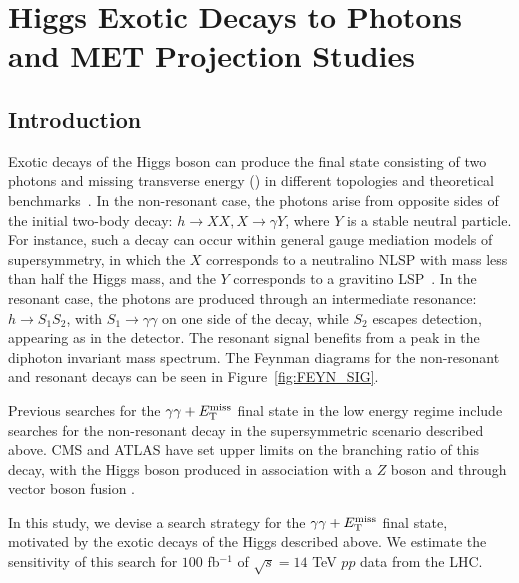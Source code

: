\section{Higgs Exotic Decays to Photons and MET Projection Studies}
\subsection{Introduction}

Exotic decays of the Higgs boson can produce the final state consisting of two photons and missing transverse energy (\MET) in different topologies and theoretical benchmarks~\cite{Curtin:2013fra}. 
%
In the non-resonant case, the photons arise from opposite sides of the initial two-body decay: $h\to XX, X\to\gamma Y$, where $Y$ is a stable neutral particle. For instance, such a decay can occur within general gauge mediation models of supersymmetry, in which the $X$ corresponds to a neutralino NLSP with mass less than half the Higgs mass, and the $Y$ corresponds to a gravitino LSP~\cite{Djouadi:1997gw, Mason:2009qh, Petersson:2012dp}.
%
In the resonant case, the photons are produced through an intermediate resonance: $h\to S_1 S_2$, with $S_1 \to\gamma\gamma$ on one side of the decay, while $S_2$ escapes detection, appearing as \MET in the detector. The resonant signal benefits from a peak in the diphoton invariant mass spectrum. 
The Feynman diagrams for the non-resonant and resonant decays can be seen in Figure~\ref{fig:FEYN_SIG}.

Previous searches for the $\gamma\gamma+E_{\mathrm{T}}^{\text{miss}}$ final state in the low energy regime include searches for the non-resonant decay in the supersymmetric scenario described above. CMS and ATLAS have set upper limits on the branching ratio of this decay, with the Higgs boson produced in association with a $Z$ boson \cite{lowmonophoton} and through vector boson fusion \cite{ATLAS:2015bra}.

In this study, we devise a search strategy for the $\gamma\gamma+E_{\mathrm{T}}^{\text{miss}}$ final state, motivated by the exotic decays of the Higgs described above. We estimate the sensitivity of this search for $100$ fb$^{-1}$ of $\sqrt{s}=14$ TeV $pp$ data from the LHC.


